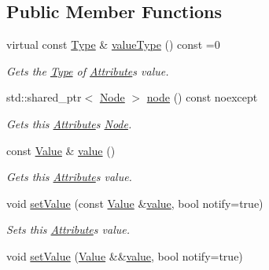 \subsection*{Public Member Functions}
\begin{DoxyCompactItemize}
\item 
virtual const \hyperlink{classdg_1_1deepcore_1_1_type}{Type} \& \hyperlink{classdg_1_1deepcore_1_1_attribute_a89c2ec9ce2e0dab7ece99571ddc5509d}{value\+Type} () const =0
\begin{DoxyCompactList}\small\item\em Gets the \hyperlink{classdg_1_1deepcore_1_1_type}{Type} of \hyperlink{classdg_1_1deepcore_1_1_attribute}{Attribute}\textquotesingle{}s value. \end{DoxyCompactList}\item 
std\+::shared\+\_\+ptr$<$ \hyperlink{classdg_1_1deepcore_1_1_node}{Node} $>$ \hyperlink{classdg_1_1deepcore_1_1_attribute_a0b233c13f5ff53cd7589315d318edafc}{node} () const noexcept
\begin{DoxyCompactList}\small\item\em Gets this \hyperlink{classdg_1_1deepcore_1_1_attribute}{Attribute}\textquotesingle{}s \hyperlink{classdg_1_1deepcore_1_1_node}{Node}. \end{DoxyCompactList}\item 
const \hyperlink{classdg_1_1deepcore_1_1_value}{Value} \& \hyperlink{classdg_1_1deepcore_1_1_attribute_ab48381d380971f353f59b091b711c96c}{value} ()
\begin{DoxyCompactList}\small\item\em Gets this \hyperlink{classdg_1_1deepcore_1_1_attribute}{Attribute}\textquotesingle{}s value. \end{DoxyCompactList}\item 
void \hyperlink{classdg_1_1deepcore_1_1_attribute_a002ee17853972cfdd95c458822778c29}{set\+Value} (const \hyperlink{classdg_1_1deepcore_1_1_value}{Value} \&\hyperlink{classdg_1_1deepcore_1_1_attribute_ab48381d380971f353f59b091b711c96c}{value}, bool notify=true)
\begin{DoxyCompactList}\small\item\em Sets this \hyperlink{classdg_1_1deepcore_1_1_attribute}{Attribute}\textquotesingle{}s value. \end{DoxyCompactList}\item 
void \hyperlink{classdg_1_1deepcore_1_1_attribute_a28f7aa47f6b0e824dec4264b8bb204f1}{set\+Value} (\hyperlink{classdg_1_1deepcore_1_1_value}{Value} \&\&\hyperlink{classdg_1_1deepcore_1_1_attribute_ab48381d380971f353f59b091b711c96c}{value}, bool notify=true)

\end{DoxyCompactItemize}
